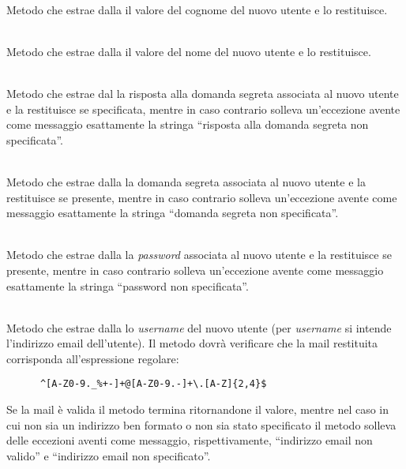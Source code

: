 \begin{description}

	\item{}\\
	Metodo che estrae dalla  il valore del cognome del nuovo utente e lo restituisce.
	
	\item{}\\
	Metodo che estrae dalla  il valore del nome del nuovo utente e lo restituisce.
	
	\item{}\\
	Metodo che estrae dal  la risposta alla domanda segreta associata al nuovo utente e la restituisce se specificata, mentre in caso contrario solleva un'eccezione avente come messaggio esattamente la stringa ``risposta alla domanda segreta non specificata''.
		
	\item{}\\
	Metodo che estrae dalla  la domanda segreta associata al nuovo utente e la restituisce se presente, mentre in caso contrario solleva un'eccezione avente come messaggio esattamente la stringa ``domanda segreta non specificata''.
	
	\item{}\\
	Metodo che estrae dalla  la \textit{password} associata al nuovo utente e la restituisce se presente, mentre in caso contrario solleva un'eccezione avente come messaggio esattamente la stringa ``password non specificata''.
	
	\item{}\\
	Metodo che estrae dalla  lo \textit{username} del nuovo utente (per \textit{username} si intende l'indirizzo email dell'utente). Il metodo dovrà verificare che la mail restituita corrisponda all'espressione regolare:
\begin{verbatim}
	  ^[A-Z0-9._%+-]+@[A-Z0-9.-]+\.[A-Z]{2,4}$
\end{verbatim}
	
Se la mail è valida il metodo termina ritornandone il valore, mentre nel caso in cui non sia un indirizzo ben formato o non sia stato specificato il metodo solleva delle eccezioni aventi come messaggio, rispettivamente, ``indirizzo email non valido'' e ``indirizzo email non specificato''.
	

\end{description}
